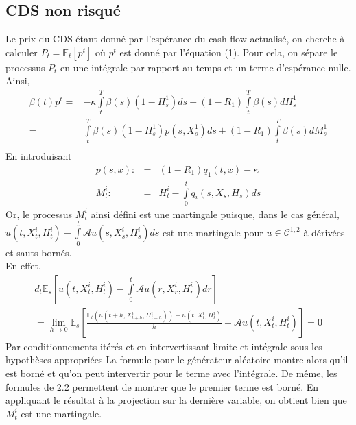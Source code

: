 \documentclass[a4paper]{article}
\begin{document}
\subsection{CDS non risqué}
Le prix du CDS étant donné par l'espérance du cash-flow actualisé, on cherche à calculer $P_{t} = \mathbb{E}_{t} \left[ p^{t} \right]$ où $p^{t}$ est donné par l'équation (1). Pour cela, on sépare le processus $P_{t}$ en une intégrale par rapport au temps et un terme d'espérance nulle.
Ainsi, \\
\begin{eqnarray*}
\beta(t) p^t =& -\kappa \int \limits_{t}^{T}\beta(s)(1-H^{1}_{s})ds + (1-R_{1})\int \limits_{t}^{T} \beta(s) dH_{s}^{1} \\
=&\int \limits_{t}^{T}\beta(s)(1-H^{1}_{s})p(s, X^{1}_s)ds + (1-R_{1})\int \limits_{t}^{T} \beta(s) dM_{s}^{1} \\
\end{eqnarray*}
En introduisant
\begin{eqnarray*}
p(s, x) :&=& (1-R_1)q_1(t,x) - \kappa \\
M_t^i :&=& H_t^i - \int \limits_0^t q_i (s, X_s, H_s) ds
\end{eqnarray*}
Or, le processus $M_t^i$ ainsi défini est une martingale puisque, dans le cas général, $u(t, X^i_t, H^i_t) - \int \limits_0^t \mathcal{A}u(s, X^i_s, H^i_s)ds$ est une martingale pour $u \in \mathcal{C}^{1, 2}$ à dérivées et sauts bornés. \\
En effet,
\begin{multline*}
d_t\mathbb{E}_s \left[ u(t, X^i_t, H^i_t) - \int \limits_0^t \mathcal{A}u(r, X^i_r, H^i_r)dr \right] \\
= \lim \limits_{h \rightarrow 0} \mathbb{E}_s \left[ \frac{\mathbb{E}_t (u(t+h, X^i_{t+h}, H^i_{t+h})) - u(t, X^i_t, H^i_t)}{h} - \mathcal{A}u(t,X^i_t,H^i_t)\right]
= 0
\end{multline*}
Par conditionnements itérés et en intervertissant limite et intégrale sous les hypothèses appropriées La formule pour le générateur aléatoire montre alors qu'il est borné et qu'on peut intervertir pour le terme avec l'intégrale. De même, les formules de 2.2 permettent de montrer que le premier terme est borné. En appliquant le résultat à la projection sur la dernière variable, on obtient bien que $M^i_t$ est une martingale. \\ \\
\end{document}
